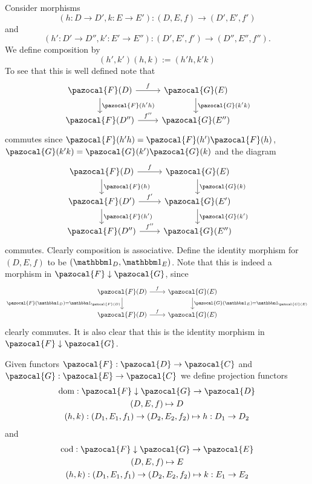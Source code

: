 \begin{remark}
    Consider morphisms 
    $$(h:D\rightarrow D',k:E\rightarrow E'):(D,E,f)\rightarrow (D',E',f')$$ 
    and 
    $$(h':D'\rightarrow D'',k':E'\rightarrow E''):(D',E',f')\rightarrow (D'',E'',f'').$$ 
    We define composition by 
    $$
        (h',k')(h,k) := (h'h,k'k)
    $$
    To see that this is well defined note that 
    $$
        \begin{tikzcd}
            \pazocal{F}(D) \arrow[r, "f"] \arrow[d,"\pazocal{F}(h'h)"] & \pazocal{G}(E) \arrow[d,"\pazocal{G}(k'k)"]\\
            \pazocal{F}(D'')\arrow[r,"f''"] & \pazocal{G}(E'')
        \end{tikzcd}
    $$
    commutes since $\pazocal{F}(h'h)=\pazocal{F}(h')\pazocal{F}(h)$, $\pazocal{G}(k'k)=\pazocal{G}(k')\pazocal{G}(k)$ and the diagram
    $$
        \begin{tikzcd}
            \pazocal{F}(D) \arrow[r, "f"] \arrow[d,"\pazocal{F}(h)"] & \pazocal{G}(E) \arrow[d,"\pazocal{G}(k)"]\\
            \pazocal{F}(D')\arrow[r,"f'"]\arrow[d,"\pazocal{F}(h')"] & \pazocal{G}(E') \arrow[d,"\pazocal{G}(k')"]\\
            \pazocal{F}(D'')\arrow[r,"f''"] & \pazocal{G}(E'')
        \end{tikzcd}
    $$
    commutes. Clearly composition is associative. Define the identity morphism for $(D,E,f)$ to be $(\fone_D,\fone_E)$. Note that this is indeed a morphism in $\pazocal{F}\downarrow \pazocal{G}$, since 
    $$
        \begin{tikzcd}
            \pazocal{F}(D) \arrow[r,"f"]\arrow[d,"\pazocal{F}(\fone_D)=\fone_{\pazocal{F}(D)}",swap] & \pazocal{G}(E)\arrow[d,"\pazocal{G}(\fone_{E})=\fone_{\pazocal{G}(E)}"]\\
            \pazocal{F}(D)\arrow[r,"f"] & \pazocal{G}(E) 
        \end{tikzcd}
    $$
    clearly commutes. It is also clear that this is the identity morphism in $\pazocal{F}\downarrow \pazocal{G}$.
\end{remark}
\begin{definition}
    Given functors $\pazocal{F}:\pazocal{D}\rightarrow \pazocal{C}$ and $\pazocal{G}:\pazocal{E}\rightarrow \pazocal{C}$ we define projection functors 
    \begin{gather*}
        \mathrm{dom}: \pazocal{F}\downarrow \pazocal{G} \rightarrow \pazocal{D}\\
        (D,E,f)\mapsto D\\
        (h,k) :(D_1,E_1,f_1) \rightarrow (D_2,E_2,f_2)\mapsto h: D_1\rightarrow D_2
    \end{gather*} 
    and 
    \begin{gather*}
        \mathrm{cod} : \pazocal{F}\downarrow\pazocal{G} \rightarrow \pazocal{E}\\
        (D,E,f)\mapsto E\\
        (h,k) :(D_1,E_1,f_1) \rightarrow (D_2,E_2,f_2)\mapsto k: E_1\rightarrow E_2
    \end{gather*}
\end{definition}
